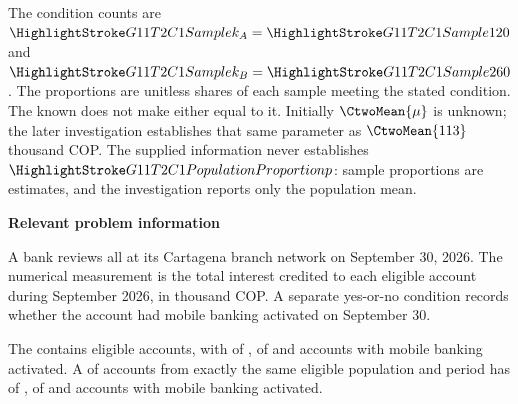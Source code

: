 The condition counts are $\Sam{k_A}=\Sam{120}$ and $\Sam{k_B}=\Sam{260}$. The proportions are unitless shares of each sample meeting the stated condition. The known  does not make either  equal to it. Initially $\CtwoMean{\mu}$ is unknown; the later investigation establishes that same parameter as $\CtwoMean{113}$ thousand COP. The supplied information never establishes $\PP{p}$: sample proportions are estimates, and the investigation reports only the population mean.

\secInicio[][sec:p2]

\clearpage



\textbf{Relevant problem information}

\begin{probleminfoexcerpt}
A bank reviews all      at its Cartagena branch network on September 30, 2026. The numerical measurement is the total interest credited to each eligible account during September 2026, in thousand COP. A separate yes-or-no condition records whether the account had mobile banking activated on September 30.
\end{probleminfoexcerpt}

\begin{probleminfoexcerpt}
The     contains  eligible accounts, with    of   ,    of    and  accounts with mobile banking activated. A     of  accounts from exactly the same eligible population and period has   of   ,    of    and  accounts with mobile banking activated.
\end{probleminfoexcerpt}



